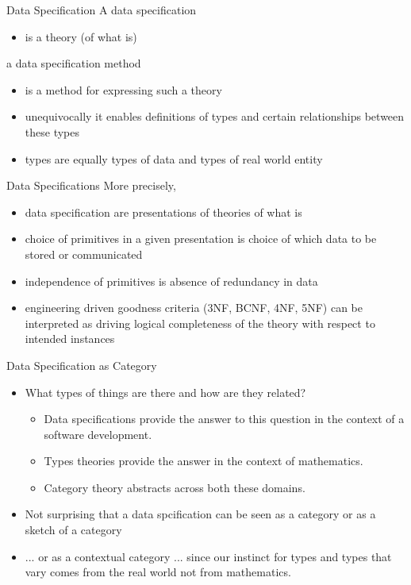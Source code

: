 

\begin{frame}{Data Specification}
A data specification  
\begin{itemize}
\item is a  theory (of what is)
\end{itemize}
\medskip
\textcolor{myblue}{\scalebox{2}{$\therefore$}} a data specification method 
\begin{itemize}
\item is a method for expressing such a  theory
\item unequivocally it enables definitions of types and certain relationships between these types
\item types are equally types of data and types of real world entity
\end{itemize}
\end{frame}

\begin{frame}{Data Specifications}
More precisely, 
\begin{itemize}
\item data specification are presentations of theories of what is
\item choice of primitives in a given presentation is choice of which data to be stored or communicated
\item independence of primitives is absence of redundancy in data 
\item engineering driven goodness criteria (3NF, BCNF, 4NF, 5NF)  can be interpreted as driving 
logical completeness of the theory with respect to intended instances
\end{itemize}
\end{frame}

\begin{frame}{Data Specification as Category}
\begin{itemize}
\item
What types of things are there and how are they related? 
\pause \begin{itemize}
\item Data specifications provide the answer to this question in the context of a software development. 
\item Types theories provide the answer in the context of mathematics. 
\item Category theory abstracts across both these domains.
\end{itemize}
\item Not surprising that a data spcification can be seen as a category or as a sketch of a category
\pause \item ... or as a contextual category
\pause ... since our instinct for types and types that vary comes from the real world not from mathematics.
\end{itemize}
\end{frame}

